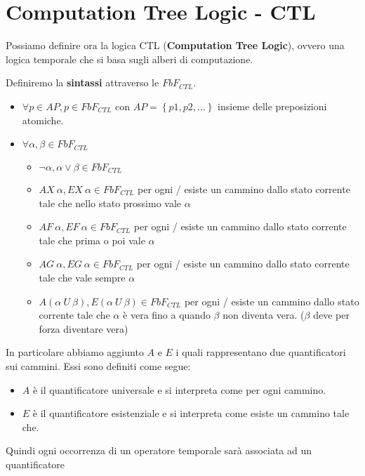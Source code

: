 \section{Computation Tree Logic - CTL}
Possiamo definire ora la logica CTL (\textbf{Computation Tree Logic}), ovvero
una logica temporale che si basa sugli alberi di computazione.

Definiremo la \textbf{sintassi} attraverso le $FbF_{CTL}$.
\begin{itemize}
    \item $\forall p \in AP, p\in FbF_{CTL}$ con $AP =\left\{p1,p2,\dots\right\}$
          insieme delle preposizioni atomiche.
    \item $\forall \alpha, \beta \in FbF_{CTL}$
          \begin{itemize}
              \item $\lnot\alpha, \alpha \lor \beta \in FbF_{CTL}$
              \item $AX \ \alpha, EX \ \alpha \in FbF_{CTL}$ per ogni / esiste
                    un cammino dallo stato corrente tale che nello stato prossimo
                    vale $\alpha$
              \item $AF \ \alpha, EF \ \alpha \in FbF_{CTL}$ per ogni / esiste
                    un cammino dallo stato corrente tale che prima o poi vale $\alpha$
              \item $AG \ \alpha, EG \ \alpha \in FbF_{CTL}$ per ogni / esiste
                    un cammino dallo stato corrente tale che vale sempre $\alpha$
              \item $A(\alpha \ U \ \beta), E(\alpha \ U \ \beta)\in FbF_{CTL}$
                    per ogni / esiste un cammino dallo stato corrente tale che
                    $\alpha$ è vera fino a quando $\beta$ non diventa vera.
                    ($\beta$ deve per forza diventare vera)
          \end{itemize}
\end{itemize}
In particolare abbiamo aggiunto $A$ e $E$ i quali rappresentano due quantificatori
sui cammini. Essi sono definiti come segue:
\begin{itemize}
    \item $A$ è il quantificatore universale e si interpreta come per ogni cammino.
    \item $E$ è il quantificatore esistenziale e si interpreta come esiste un
          cammino tale che.
\end{itemize}
Quindi ogni occorrenza di un operatore temporale sarà associata ad un quantificatore
